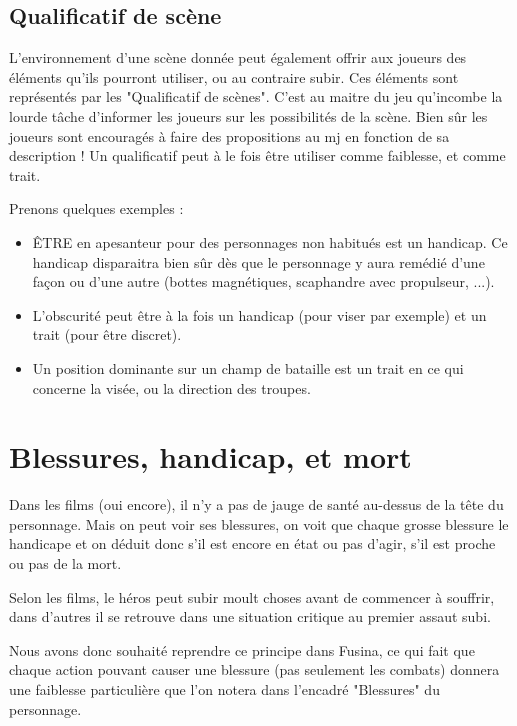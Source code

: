 \begin{multicols}{2}

\subsection{Qualificatif de scène}

	L'environnement d'une scène donnée peut également offrir aux joueurs des éléments qu'ils pourront utiliser, ou au contraire subir. Ces éléments sont représentés par les "Qualificatif de scènes". C'est au maitre du jeu qu'incombe la lourde tâche d'informer les joueurs sur les possibilités de la scène. Bien sûr les joueurs sont encouragés à faire des propositions au mj en fonction de sa description ! Un qualificatif peut à le fois être utiliser comme faiblesse, et comme trait.

	Prenons quelques exemples :
	\begin{itemize}
		\item ÊTRE en apesanteur pour des personnages non habitués est un handicap. Ce handicap disparaitra bien sûr dès que le personnage y aura remédié d'une façon ou d'une autre (bottes magnétiques, scaphandre avec propulseur, ...).
		\item L'obscurité peut être à la fois un handicap (pour viser par exemple) et un trait (pour être discret).
		\item Un position dominante sur un champ de bataille est un trait en ce qui concerne la visée, ou la direction des troupes.
	\end{itemize}

\section{Blessures, handicap, et mort}

Dans les films (oui encore), il n'y a pas de jauge de santé au-dessus de la tête du personnage. Mais on peut voir ses blessures, on voit que chaque grosse blessure le handicape et on déduit donc s'il est encore en état ou pas d'agir, s'il est proche ou pas de la mort.

Selon les films, le héros peut subir moult choses avant de commencer à souffrir, dans d'autres il se retrouve dans une situation critique au premier assaut subi.

Nous avons donc souhaité reprendre ce principe dans Fusina, ce qui fait que chaque action pouvant causer une blessure (pas seulement les combats) donnera une faiblesse particulière que l'on notera dans l'encadré "Blessures" du personnage.


\end{multicols}
